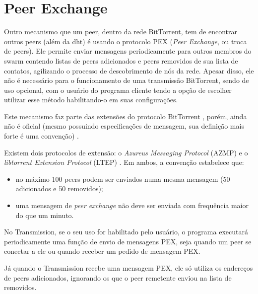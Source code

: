 
\section{Peer Exchange}

Outro mecanismo que um \gls*{peer}, dentro da rede BitTorrent, tem de encontrar outros
\glspl*{peer} (além da \gls*{dht}) é usando o protocolo PEX (\emph{Peer Exchange}, ou
troca de \glspl*{peer}). Ele permite enviar mensagens periodicamente para outros
membros do \gls*{swarm} contendo listas de \glspl*{peer} adicionados e \glspl*{peer}
removidos de sua lista de contatos, agilizando o processo de descobrimento de nós da
rede. Apesar disso, ele não é necessário para o funcionamento de uma transmissão
BitTorrent, sendo de uso opcional, com o usuário do programa cliente tendo a opção de
escolher utilizar esse método habilitando-o em suas configurações.

Este mecanismo faz parte das extensões do protocolo BitTorrent
\cite{site:bittorrent-extension}, porém, ainda não é oficial (mesmo possuindo
especificações de mensagem, sua definição mais forte é uma convenção)
\cite{wikitheory:pex}.

Existem dois protocolos de extensão: o \emph{Azureus Messaging Protocol} (AZMP) e o
\emph{libtorrent Extension Protocol} (LTEP) \cite{site:libtorrent}. Em ambos, a
convenção estabelece que:

\begin{itemize}
    \item no máximo 100 \glspl*{peer} podem ser enviados numa mesma mensagem (50
        adicionados e 50 removidos);
    \item uma mensagem de \emph{peer exchange} não deve ser enviada com frequência maior
        do que um minuto.
\end{itemize}

No Transmission, se o seu uso for habilitado pelo usuário, o programa executará
periodicamente uma função de envio de mensagens PEX, seja quando um \gls*{peer} se
conectar a ele ou quando receber um pedido de mensagem PEX.


Já quando o Transmission recebe uma mensagem PEX, ele só utiliza os endereços de
\glspl*{peer} adicionados, ignorando os que o \gls*{peer} remetente enviou na lista de
removidos.


